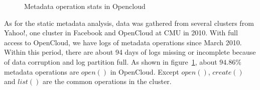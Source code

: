 \begin{figure}[t!h]
    \center
    \caption{Metadata operation stats in Opencloud}
    \label{fig:opcount_opencloud}
\end{figure}

As for the static metadata analysis, data was gathered from several clusters from Yahoo!, one cluster in Facebook and OpenCloud at CMU in 2010. With full access to OpenCloud, we have logs of metadata operations since March 2010. Within this period, there are about 94 days of logs missing or incomplete  because of data corruption and log partition full. As shown in figure~\ref{fig:opcount_opencloud}, about $94.86\%$ metadata operations are $open()$ in OpenCloud. Except $open()$, $create()$ and $list()$ are the common operations in the cluster.
